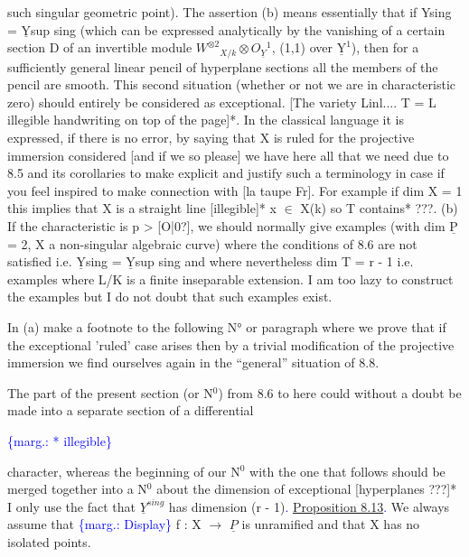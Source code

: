 \documentclass[11pt]{article}
\newcommand{\scanpage}[1]{\par\bigskip\noindent{\small\sffamily[scan #1]}\par}
\newcommand{\mspage}[1]{{\small\sffamily[p.\,#1]}}
\newcommand{\hand}[1]{\textcolor{blue}{#1}}
\newcommand{\margin}[1]{\textcolor{blue}{\{\textsf{marg.:} #1\}}}
\newcommand{\uline}[1]{\underline{#1}}
\newcommand{\unsure}[1]{[#1?]}
\begin{document}
such singular geometric point).  The assertion (b) means
essentially that if Ysing = $\underline{\text{Y}}$sup sing (which can be expressed
analytically by the vanishing of a certain section D of an
invertible module $W^{\otimes 2}{}_{X/k} \otimes O_{\underline{Y}}{}^{1}$, (1,1) over $\underline{\text{Y}}^{1}$), then for a
sufficiently general linear pencil of hyperplane sections all the
members of the pencil are smooth.  This second situation (whether
or not we are in characteristic zero) should entirely be
considered as exceptional.  [The variety Linl.... T = L illegible
handwriting on top of the page]*.  In the classical language it is
expressed, if there is no error, by saying that X is ruled for the
projective immersion considered [and if we so please] we have here
all that we need due to 8.5 and its corollaries to make explicit
and justify such a terminology in case if you feel inspired to
make connection with [la taupe Fr].  For example if dim X = 1 this
implies that X is a straight line [illegible]* x $\in$ X(k) so T
contains* ???.  (b) If the characteristic is p > \unsure{O|0}, we should
normally give examples (with dim $\underline{\text{P}}$ = 2, X a non-singular algebraic
curve) where the conditions of 8.6 are not satisfied i.e. $\underline{\text{Y}}$sing =
$\underline{\text{Y}}$sup sing and where nevertheless dim T = r - 1 i.e. examples where
L/K is a finite inseparable extension.  I am too lazy to construct
the examples but I do not doubt that such examples exist.

In (a) make a footnote to the following N° or paragraph where
we prove that if the exceptional 'ruled' case arises then by a
trivial modification of the projective immersion we find ourselves
again in the ``general'' situation of 8.8.

The part of the present section (or N$^{0}$) from 8.6 to here could
without a doubt be made into a separate section of a differential

\margin{* illegible}

\clearpage
\scanpage{24/54}
\mspage{54}

character, whereas the beginning of our N$^0$ with the one that
follows should be merged together into a N$^0$ about the dimension of
exceptional [hyperplanes ???]*  I only use the fact that $\underline{Y}^{sing}$ has
dimension (r - 1)\hand{.} \uline{Proposition 8.13}\hand{.} We always assume that \margin{Display}
f : X $\to$ $\underline{P}$ is unramified and that X has no isolated points.
\end{document}
